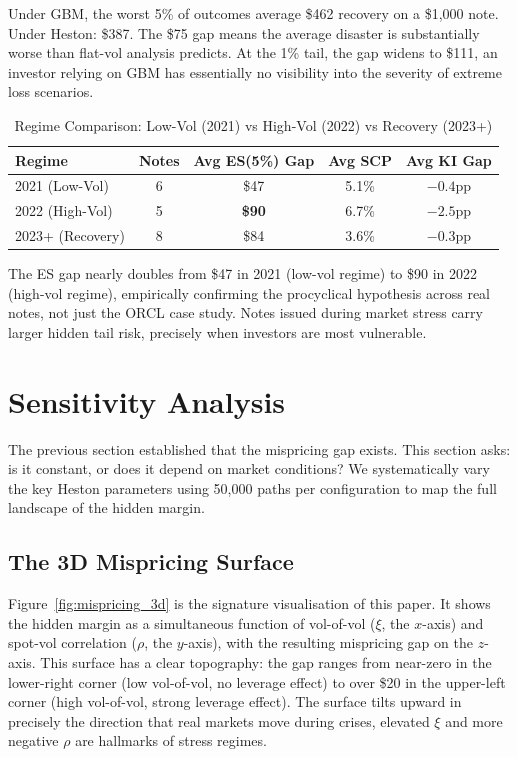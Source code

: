 \documentclass[12pt,a4paper]{article}
\begin{document}
Under GBM, the worst 5\% of outcomes average \$462 recovery on a \$1,000 note. Under Heston: \$387. The \$75 gap means the average disaster is substantially worse than flat-vol analysis predicts. At the 1\% tail, the gap widens to \$111, an investor relying on GBM has essentially no visibility into the severity of extreme loss scenarios.

\begin{table}[H]
\centering
\caption{Regime Comparison: Low-Vol (2021) vs High-Vol (2022) vs Recovery (2023+)}
\label{tab:regime_20}
\begin{tabular}{@{}lcccc@{}}
\toprule
\textbf{Regime} & \textbf{Notes} & \textbf{Avg ES(5\%) Gap} & \textbf{Avg SCP} & \textbf{Avg KI Gap} \\
\midrule
2021 (Low-Vol) & 6 & \$47 & 5.1\% & $-0.4$pp \\
2022 (High-Vol) & 5 & \textbf{\$90} & 6.7\% & $-2.5$pp \\
2023+ (Recovery) & 8 & \$84 & 3.6\% & $-0.3$pp \\
\bottomrule
\end{tabular}
\end{table}

The ES gap nearly doubles from \$47 in 2021 (low-vol regime) to \$90 in 2022 (high-vol regime), empirically confirming the procyclical hypothesis across real notes, not just the ORCL case study. Notes issued during market stress carry larger hidden tail risk, precisely when investors are most vulnerable.

\newpage
\section{Sensitivity Analysis}
\label{sec:sensitivity}

The previous section established that the mispricing gap exists. This section asks: is it constant, or does it depend on market conditions? We systematically vary the key Heston parameters using 50,000 paths per configuration to map the full landscape of the hidden margin.

\subsection{The 3D Mispricing Surface}

Figure~\ref{fig:mispricing_3d} is the signature visualisation of this paper. It shows the hidden margin as a simultaneous function of vol-of-vol ($\xi$, the $x$-axis) and spot-vol correlation ($\rho$, the $y$-axis), with the resulting mispricing gap on the $z$-axis. This surface has a clear topography: the gap ranges from near-zero in the lower-right corner (low vol-of-vol, no leverage effect) to over \$20 in the upper-left corner (high vol-of-vol, strong leverage effect). The surface tilts upward in precisely the direction that real markets move during crises, elevated $\xi$ and more negative $\rho$ are hallmarks of stress regimes.
\end{document}
